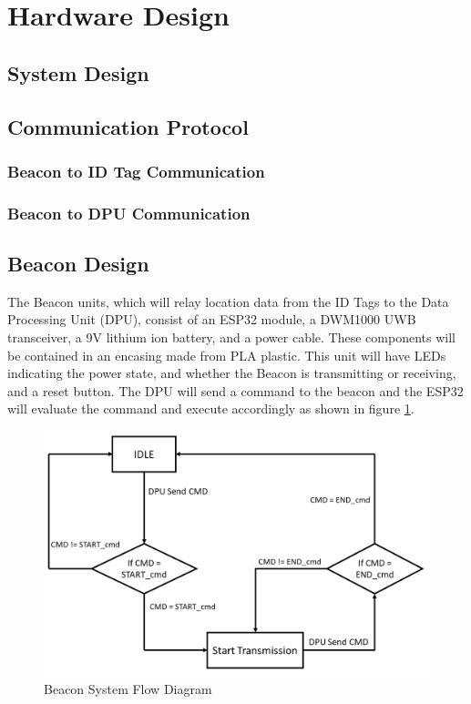 

\setcounter{section}{3}
\section{Hardware Design}
\bigskip
\subsection{System Design}





\pagebreak
\subsection{Communication Protocol}
\subsubsection{Beacon to ID Tag Communication}
\pagebreak
\subsubsection{Beacon to DPU Communication}



\pagebreak
\subsection{Beacon Design}
The Beacon units, which will relay location data from the ID Tags to the Data Processing Unit (DPU), consist of an ESP32 module, a DWM1000 UWB transceiver, a 9V lithium ion battery, and a power cable. These components will be contained in an encasing made from PLA plastic. This unit will have LEDs indicating the power state, and whether the Beacon is transmitting or receiving, and a reset button. The DPU will send a command to the beacon and the ESP32 will evaluate the command and execute accordingly as shown in figure \ref{bcn_flow}.

\medskip
\begin{figure}[H]
\centering
    \includegraphics[scale=0.40]{./images/beacon_flow.png}
    \caption{Beacon System Flow Diagram}
    \label{bcn_flow}
\end{figure}
\medskip

